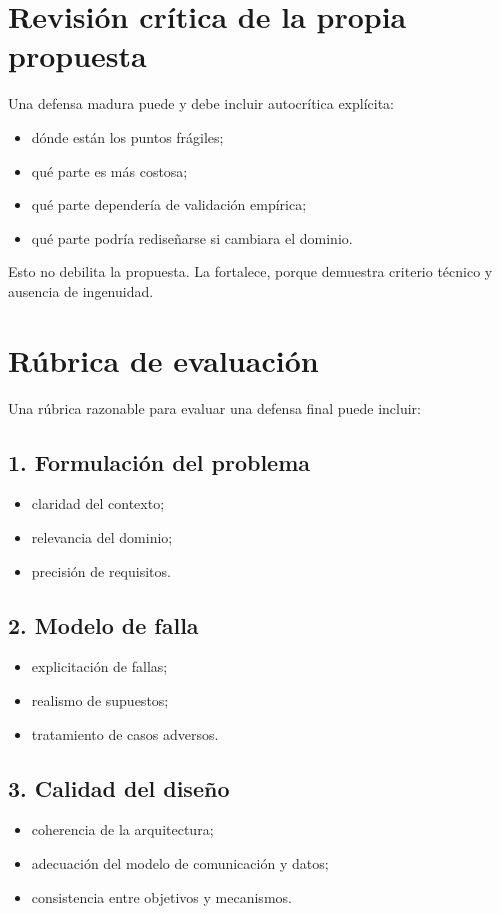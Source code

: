 \documentclass[variant=apuntes,cover=institutional,mode=screen]{ua-engineering-v6-article}
\begin{document}
\section{Revisión crítica de la propia propuesta}

Una defensa madura puede y debe incluir autocrítica explícita:
\begin{itemize}
\item dónde están los puntos frágiles;
\item qué parte es más costosa;
\item qué parte dependería de validación empírica;
\item qué parte podría rediseñarse si cambiara el dominio.
\end{itemize}

Esto no debilita la propuesta. La fortalece, porque demuestra criterio técnico y ausencia de ingenuidad.

\section{Rúbrica de evaluación}

Una rúbrica razonable para evaluar una defensa final puede incluir:

\subsection{1. Formulación del problema}
\begin{itemize}
\item claridad del contexto;
\item relevancia del dominio;
\item precisión de requisitos.
\end{itemize}

\subsection{2. Modelo de falla}
\begin{itemize}
\item explicitación de fallas;
\item realismo de supuestos;
\item tratamiento de casos adversos.
\end{itemize}

\subsection{3. Calidad del diseño}
\begin{itemize}
\item coherencia de la arquitectura;
\item adecuación del modelo de comunicación y datos;
\item consistencia entre objetivos y mecanismos.
\end{itemize}
\end{document}
